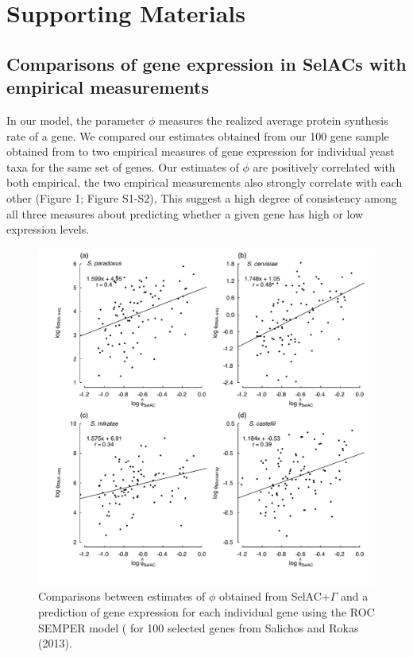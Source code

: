 \documentclass{article}
\begin{document}
\section*{Supporting Materials}

\subsection*{Comparisons of gene expression in SelACs with empirical measurements}

In our model, the parameter $\phi$ measures the realized average protein synthesis rate of a gene. 
We compared our estimates obtained from our 100 gene sample obtained from \citet{SalichosAndRokas2013} to two empirical measures of gene expression for individual yeast taxa for the same set of genes. 
Our estimates of $\phi$ are positively correlated with both empirical, the two empirical measurements also strongly correlate with each other (Figure 1; Figure S1-S2), 
This suggest a high degree of consistency among all three measures about predicting whether a given gene has high or low expression levels.

\begin{figure}[H]
  \centering
  \includegraphics[width=0.9\linewidth]{FIGURE_S1_SelACwG_vs_Empirical_by_spp.pdf}
  \caption{Comparisons between estimates of $\phi$ obtained from SelAC+$\Gamma$ and a prediction of gene expression for each individual gene using the ROC SEMPER model (\citet{GilchristEtAl2015} for 100 selected genes from Salichos and Rokas (2013).
  } 
  \label{fig:PhivsROC}
\end{figure}
\end{document}
